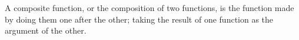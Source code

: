 A composite function, or the composition of two functions, is the function made
by doing them one after the other; taking the result of
one function as the argument of the other.